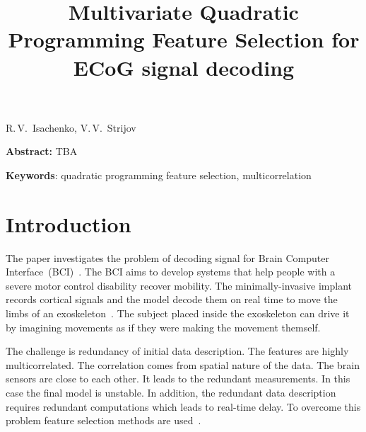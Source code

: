 \documentclass[12pt,twoside]{article}
\theoremstyle{definition}
\begin{document}
	
	\linenumbers
	
	\title
{Multivariate Quadratic Programming Feature Selection for ECoG signal decoding}
\date{}
\maketitle
\begin{center}
	R.\,V.~Isachenko,
	V.\,V.~Strijov
\end{center}
\textbf{Abstract:} 
TBA

\bigskip
\textbf{Keywords}: quadratic programming feature selection, multicorrelation

\section{Introduction}
The paper investigates the problem of decoding signal for Brain Computer Interface~(BCI)~\cite{costecalde2018long}. 
The BCI aims to develop systems that help people with a severe motor control disability recover mobility.
The minimally-invasive implant records cortical signals and the model decode them on real time to move the limbs of an exoskeleton~\cite{mestais2015wimagine,eliseyev2014clinatec}.
The subject placed inside the exoskeleton can drive it by imagining movements as if they were making the movement themself. 

The challenge is redundancy of initial data description. The features are highly multicorrelated. The correlation comes from spatial nature of the data. The brain sensors are close to each other. It leads to the redundant measurements. In this case the final model is unstable. In addition, the redundant data description requires redundant computations which leads to real-time delay. To overcome this problem feature selection methods are used~\cite{katrutsa2015stress,li2017feature}.
\end{document}

